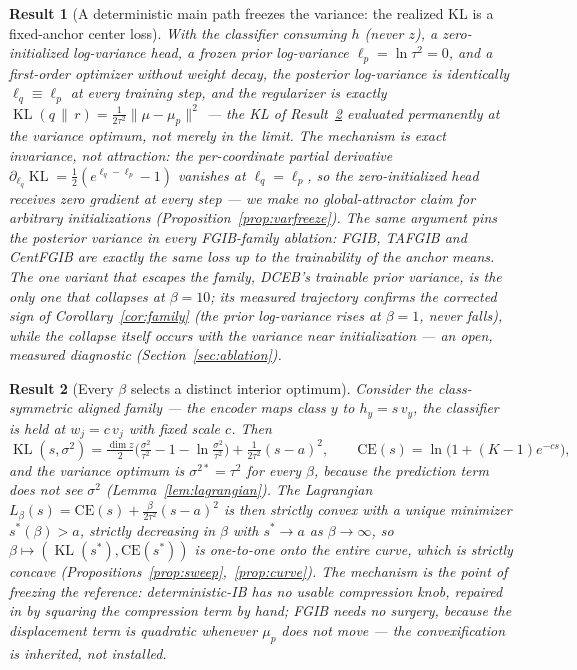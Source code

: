 \documentclass{article} %
\newtheorem{result}{Result}   %
\newcommand{\KLd}{\operatorname{KL}}
\newcommand{\CE}{\mathrm{CE}}
\begin{document}
\begin{result}[A deterministic main path freezes the variance: the realized KL is a fixed-anchor center loss]
\label{res:varfreeze}
With the classifier consuming $h$ (never $z$), a zero-initialized log-variance head, a
frozen prior log-variance $\ell_p = \ln\tau^2 = 0$, and a first-order optimizer without
weight decay, the posterior log-variance is \emph{identically} $\ell_q \equiv \ell_p$ at
every training step, and the regularizer is exactly
$\KLd(q\,\|\,r) = \tfrac{1}{2\tau^2}\|\mu - \mu_p\|^2$ --- the KL of
Result~\ref{res:sweep} evaluated permanently at the variance optimum, not merely in the
limit. The mechanism is exact invariance, not attraction: the per-coordinate partial
derivative $\partial_{\ell_q}\KLd = \tfrac12(e^{\ell_q-\ell_p}-1)$ vanishes at
$\ell_q = \ell_p$, so the zero-initialized head receives zero gradient at every step ---
we make no global-attractor claim for arbitrary initializations
(Proposition~\ref{prop:varfreeze}). The same argument pins the posterior variance in
every FGIB-family ablation: FGIB, TAFGIB and CentFGIB are \emph{exactly} the same loss
up to the trainability of the anchor means. The one variant that escapes the family,
DCEB's trainable prior variance, is the only one that collapses at $\beta = 10$; its
measured trajectory confirms the corrected sign of Corollary~\ref{cor:family} (the
prior log-variance \emph{rises} at $\beta{=}1$, never falls), while the collapse itself
occurs with the variance near initialization --- an open, measured diagnostic
(Section~\ref{sec:ablation}).
\end{result}

\begin{result}[Every $\beta$ selects a distinct interior optimum]
\label{res:sweep}
Consider the class-symmetric aligned family --- the encoder maps class $y$ to
$h_y = s\,v_y$, the classifier is held at $w_j = c\,v_j$ with fixed scale $c$. Then
\begin{equation}
\KLd(s,\sigma^2) = \tfrac{\dim z}{2}\Big(\tfrac{\sigma^2}{\tau^2} - 1
- \ln\tfrac{\sigma^2}{\tau^2}\Big) + \tfrac{1}{2\tau^2}(s-a)^2,
\qquad
\CE(s) = \ln\!\big(1 + (K-1)e^{-cs}\big),
\label{eq:reduced}
\end{equation}
and the variance optimum is $\sigma^{2*} = \tau^2$ for \emph{every} $\beta$, because the
prediction term does not see $\sigma^2$ (Lemma~\ref{lem:lagrangian}). The Lagrangian
$L_\beta(s) = \CE(s) + \tfrac{\beta}{2\tau^2}(s-a)^2$ is then strictly convex with a
unique minimizer $s^*(\beta) > a$, strictly decreasing in $\beta$ with $s^* \to a$ as
$\beta \to \infty$, so $\beta \mapsto (\KLd(s^*), \CE(s^*))$ is one-to-one onto the
entire curve, which is strictly concave (Propositions~\ref{prop:sweep},~\ref{prop:curve}).
The mechanism is the point of freezing the reference: deterministic-IB has no usable
compression knob, repaired in \citet{kolchinsky2019caveats} by \emph{squaring} the
compression term by hand; FGIB needs no surgery, because the displacement term is
quadratic \emph{whenever $\mu_p$ does not move} --- the convexification is inherited,
not installed.
\end{result}
\end{document}
